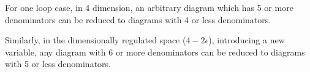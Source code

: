 \documentclass[10pt]{article}
\begin{document}
For one loop case, in 4 dimension, an arbitrary diagram which has 5 or more denominators can be reduced to diagrams with 4 or less denominators.

Similarly, in the dimensionally regulated space ($4-2\epsilon$), introducing a new variable, any diagram with 6 or more denominators can be reduced to diagrams with 5 or less denominators.
\end{document}
